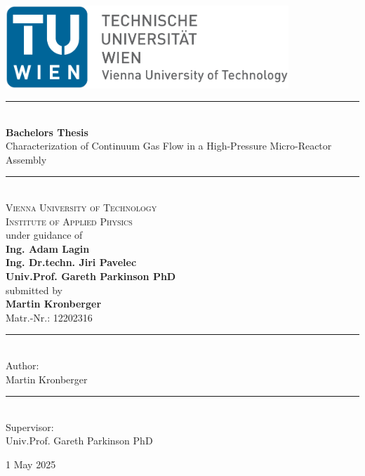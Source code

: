 \thispagestyle{empty}

\newcommand{\HRule}{\rule{\linewidth}{0.5mm}} %

\includegraphics[width=0.8\textwidth]{src/00_intro/logo_en.jpg}

\vspace{2cm}

\begin{center} %

\HRule \\[0.4cm]
{\Huge \bfseries Bachelors Thesis}\\[0.5cm] %
{\Large Characterization of Continuum Gas Flow in a High-Pressure Micro-Reactor Assembly}
\HRule \\[2cm]

\textsc{\LARGE Vienna University of Technology}\\[0.5cm] 
\textsc{\Large Institute of Applied Physics}\\[1cm]

{under guidance of}\\[0.3cm]

\textbf{Ing. Adam Lagin}\\
\textbf{Ing. Dr.techn. Jiri Pavelec}\\
\textbf{Univ.Prof. Gareth Parkinson PhD}\\[0.5cm]

{submitted by}\\[0.3cm]
\textbf{Martin Kronberger}\\
{Matr.-Nr.: 12202316}

\vfill

\begin{minipage}[t]{0.4\textwidth}
\begin{flushleft}
\rule{6cm}{0.4pt} \\[0.2cm]
Author:\\
Martin Kronberger
\end{flushleft}
\end{minipage}
\hfill
\begin{minipage}[t]{0.4\textwidth}
\begin{flushleft}
\rule{6cm}{0.4pt} \\[0.2cm]
Supervisor:\\
Univ.Prof. Gareth Parkinson PhD
\end{flushleft}
\end{minipage}

\vspace{1cm}

{\large 1 May 2025}
\end{center}

\blankpage
